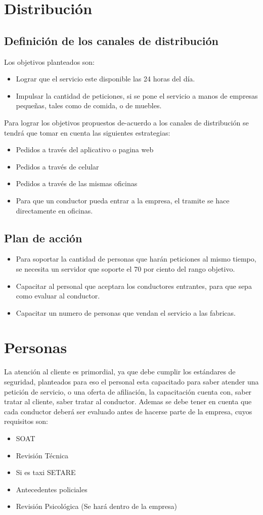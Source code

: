 \section{Distribución}
\subsection{Definición de los canales de distribución}
Los objetivos planteados son:
\begin{itemize}
\item Lograr que el servicio este disponible las 24 horas del día. 
\item Impulsar la cantidad de peticiones, si se pone el servicio a manos de empresas pequeñas, tales como de comida, o de muebles.
\end{itemize}
Para lograr los objetivos propuestos de-acuerdo a los canales de distribución se tendrá que tomar en cuenta las siguientes estrategias:
\begin{itemize}
\item Pedidos a través del aplicativo o pagina web
\item Pedidos a través de celular 
\item Pedidos a través de las mismas oficinas 
\item Para que un conductor pueda entrar a la empresa, el tramite se hace directamente en oficinas.
\end{itemize}
\subsection{Plan de acción}
\begin{itemize}
\item Para soportar la cantidad de personas que harán peticiones al mismo tiempo, se necesita un servidor que soporte el 70 por ciento del rango objetivo.
\item Capacitar al personal que aceptara los conductores entrantes, para que sepa como evaluar al conductor.
\item Capacitar un numero de personas que vendan el servicio a las fabricas.
\end{itemize}
\section{Personas}
La atención al cliente es primordial, ya que debe cumplir los estándares de seguridad, planteados para eso el personal esta capacitado para saber atender una petición de servicio, o una oferta de afiliación, la capacitación cuenta con, saber tratar al cliente, saber tratar al conductor. 
Ademas se debe tener en cuenta que cada conductor deberá ser evaluado antes de hacerse parte de la empresa, cuyos requisitos son:
\begin{itemize}
\item SOAT
\item Revisión Técnica 
\item Si es taxi SETARE
\item Antecedentes policiales
\item Revisión Psicológica (Se hará dentro de la empresa)

\end{itemize}

